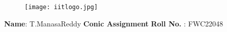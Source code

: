 \documentclass[10pt,a4paper]{report}
\begin{document}
\begin{figure}[!tbp]
  \centering
  \begin{minipage}[b]{0.4\textwidth}
  \end{minipage}
  \hfill
  \vspace{5mm}\begin{minipage}[b]{0.4\textwidth}
\raggedleft  \texttt{[image: iitlogo.jpg]}  \

  \end{minipage}\vspace{0.2cm}
\end{figure}
\raggedright \textbf{Name}:\hspace{1mm} T.ManasaReddy\hspace{3cm} \Large \textbf{Conic Assignment}\hspace{2.5cm} %
\normalsize \textbf{Roll No.} :\hspace{1mm} FWC22048\vspace{1cm}
\end{document}
